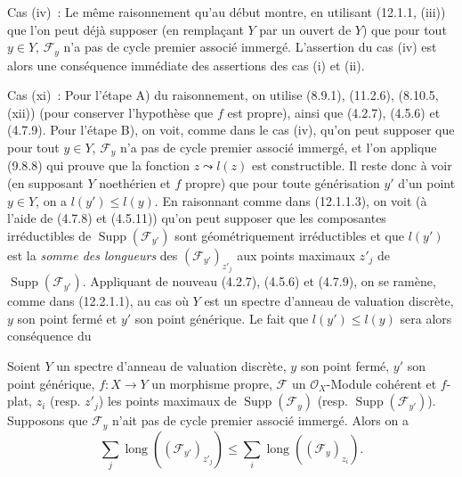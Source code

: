 \begin{env}[12.2.1.2]
\label{IV.12.2.1.2-fr}
Cas (iv)~: Le même raisonnement qu'au début montre, en utilisant (12.1.1,
(iii)) que l'on peut déjà supposer (en remplaçant $Y$ par un ouvert de $Y$) que
pour tout $y\in Y$, $\mathcal F_y$ n'a pas de cycle premier associé immergé.
L'assertion du cas (iv) est alors une conséquence immédiate des assertions des
cas (i) et (ii).
\end{env}

\begin{env}[12.2.1.3]
\label{IV.12.2.1.3-fr}
Cas (xi)~: Pour l'étape A) du raisonnement, on utilise (8.9.1), (11.2.6),
(8.10.5, (xii)) (pour conserver l'hypothèse que $f$ est propre), ainsi que
(4.2.7), (4.5.6) et (4.7.9). Pour l'étape B), on voit, comme dans le cas (iv),
qu'on peut supposer que pour tout $y\in Y$, $\mathcal F_y$ n'a pas de cycle
premier associé immergé, et l'on applique (9.8.8) qui prouve que la fonction
$z\leadsto l(z)$ est constructible. Il reste donc à voir (en supposant $Y$
noethérien et $f$ propre) que pour toute générisation $y'$ d'un point $y\in Y$,
on a $l(y')\leq l(y)$. En raisonnant comme dans (12.1.1.3), on voit (à l'aide
de (4.7.8) et (4.5.11)) qu'on peut supposer que les composantes irréductibles
de $\operatorname{Supp}(\mathcal F_{y'})$ sont géométriquement irréductibles
et que $l(y')$ est la \emph{somme des longueurs} des
$(\mathcal F_{y'})_{z'_j}$ aux points maximaux $z'_j$ de
$\operatorname{Supp}(\mathcal F_{y'})$. Appliquant de nouveau (4.2.7), (4.5.6)
et (4.7.9), on se ramène, comme dans (12.2.1.1), au cas où $Y$ est un spectre
d'anneau de valuation discrète, $y$ son point fermé et $y'$ son point générique.
Le fait que $l(y')\leq l(y)$ sera alors conséquence du

\begin{lemma}[12.2.1.4]
\label{IV.12.2.1.4-fr}
Soient $Y$ un spectre d'anneau de valuation discrète, $y$ son point fermé,
$y'$ son point générique, $f:X\to Y$ un morphisme propre, $\mathcal F$ un
$\mathcal O_X$-Module cohérent et $f$-plat, $z_i$ \textup{(resp. $z'_j$)} les points
maximaux de $\operatorname{Supp}(\mathcal F_y)$ \textup{(resp.
$\operatorname{Supp}(\mathcal F_{y'})$)}. Supposons que $\mathcal F_y$ n'ait
pas de cycle premier associé immergé. Alors on a
\[
  \sum_j\operatorname{long}((\mathcal F_{y'})_{z'_j})
  \leq\sum_i\operatorname{long}((\mathcal F_y)_{z_i}).
\]
\end{lemma}


\end{env}
